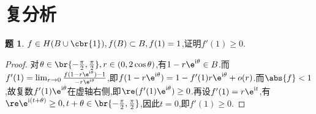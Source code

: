 \documentclass{article}
\renewcommand{\i}{\mathrm{i}}
\theoremstyle{definition}
\newtheorem{exercise}{题}[section]
\begin{document}
\section{复分析}
\begin{exercise}
    $f\in H(B\cup \cbr{1}),f(B)\subset B ,f(1)=1$,证明$f'(1)\geq 0$.
\end{exercise}
\begin{proof}
    对$\theta\in \br{-\frac{\pi}{2},\frac{\pi}{2}}, r\in (0,2\cos \theta)$,有$1-r\e^{\i\theta}\in B$.而$f'(1)=\lim_{r\to 0}\frac{f(1-r\e^{\i\theta})-1}{-r\e^{\i\theta}}$,即$f(1-r\e^{\i\theta})=1-f'(1)r\e^{\i\theta}+o(r)$.而$\abs{f}<1$,故复数$f'(1)\e^{\i\theta}$在虚轴右侧,即$\re(f'(1)\e^{\i\theta})\geq 0$.再设$f'(1)=r\e^{\i t}$,有$\re\e^{\i(t+\theta)}\geq 0, t+\theta\in \br{-\frac{\pi}{2},\frac{\pi}{2}}$,因此$t=0$,即$f'(1)\geq 0$.
\end{proof}
\end{document}
